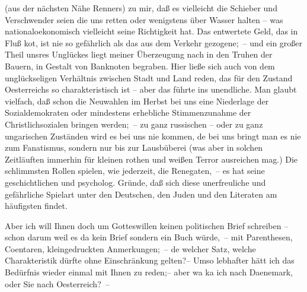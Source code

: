                (aus der nächsten Nähe Renners) zu mir, daß es
               vielleicht die Schieber und Verschwender seien die uns retten oder wenigstens über
               Wasser halten – was nationaloekonomisch vielleicht seine Richtigkeit hat. Das
               entwertete Geld, das in Fluß ko{\geminationm}t, ist nie so gefährlich
               als das aus dem Verkehr gezogene; – und ein großer Theil unsres Unglückes liegt
               meiner Überzeugung nach in den Truhen der Bauern, in Gestalt von Banknoten begraben.
               Hier ließe sich auch von dem unglückseligen Verhältnis zwischen Stadt {\pb}und Land reden, das für den Zustand Oesterreichs so charakteristisch ist – aber das
               führte ins unendliche. Man glaubt vielfach, daß schon die Neuwahlen im Herbst bei uns
               eine Niederlage der Sozialdemokraten oder mindestens erhebliche Stimmenzunahme der
               Christlichsozialen bringen werden; – zu ganz russischen – oder zu ganz ungarischen
               Zuständen wird es bei uns nie kommen, de{\geminationn} bei uns bringt
               man \strikeout{\textcolor{gray}{×}\-\textcolor{gray}{×}} es nie zum Fanatismus, sondern nur \introOben{}bis\introOben{} zur
               Lausbüberei (was aber in solchen Zeitläuften immerhin für kleinen rothen und weißen
               Terror ausreichen mag.) Die schlimmsten Rollen spielen, wie jederzeit, die
               Renegaten, – es hat seine geschichtlichen \introOben{}und psycholog.\introOben{}
               Gründe, daß sich diese \introOben{}unerfreuliche und gefährliche\introOben{}
               Spielart unter den Deutschen, den Juden und den Literaten am häufigsten findet.\pend
           
\pstart
           {\pb}Aber ich will Ihnen doch um Gotteswillen keinen
               politischen Brief schreiben – schon darum weil es da{\geminationn}
               kein Brief sondern ein Buch würde, – mit Parenthesen, Co{\geminationm}entaren, kleingedruckten Anmerkungen; – de{\geminationn} welcher
               Satz, welche Charakteristik dürfte ohne Einschränkung gelten?– Umso lebhafter hätt
               ich das Bedürfnis wieder einmal mit Ihnen zu reden;– aber wa{\geminationn} ka{\geminationn} ich nach Daenemark, oder Sie nach Oesterreich? –\pend
           
